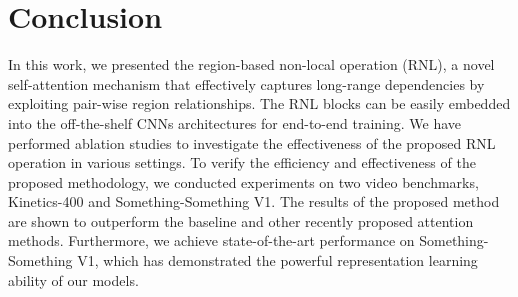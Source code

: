 \documentclass[a4paper,conference]{IEEEtran}
\begin{document}
\section{Conclusion}
In this work, we presented the region-based non-local operation (RNL), a novel self-attention mechanism that effectively captures long-range dependencies by exploiting pair-wise region relationships. The RNL blocks can be easily embedded into the off-the-shelf CNNs architectures for end-to-end training. We have performed ablation studies to investigate the effectiveness of the proposed RNL operation in various settings. To verify the efficiency and effectiveness of the proposed methodology, we conducted experiments on two video benchmarks, Kinetics-400 and Something-Something V1. The results of the proposed method are shown to outperform the baseline and other recently proposed attention methods. Furthermore, we achieve state-of-the-art performance on Something-Something V1, which has demonstrated the powerful representation learning ability of our models. 




\end{document}
